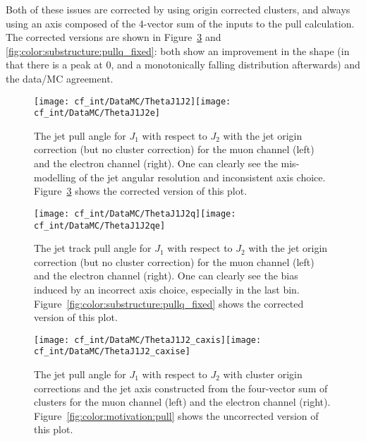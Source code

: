 Both of these issues are corrected by using origin corrected clusters, and always using an axis composed of the 4-vector sum of the inputs to the pull calculation. The corrected versions are shown in Figure~\ref{fig:color:substructure:pull_fixed} and \ref{fig:color:substructure:pullq_fixed}: both show an improvement in the shape (in that there is a peak at 0, and a monotonically falling distribution afterwards) and the data/MC agreement.


\begin{figure}[h!]
\begin{center}
\texttt{[image: cf\_int/DataMC/ThetaJ1J2]}\texttt{[image: cf\_int/DataMC/ThetaJ1J2e]}
 \caption{The jet pull angle for $J_1$ with respect to $J_2$ with the jet origin correction (but no cluster correction) for the muon channel (left) and the electron channel (right). One can clearly see the mis-modelling of the jet angular resolution and inconsistent axis choice. Figure~\ref{fig:color:substructure:pull_fixed} shows the corrected version of this plot.}
 \label{fig:color:substructure:pull}
  \end{center}
\end{figure}

\begin{figure}[h!]
\begin{center}
\texttt{[image: cf\_int/DataMC/ThetaJ1J2q]}\texttt{[image: cf\_int/DataMC/ThetaJ1J2qe]}
 \caption{The jet track pull angle for $J_1$ with respect to $J_2$ with the jet origin correction (but no cluster correction) for the muon channel (left) and the electron channel (right). One can clearly see the bias induced by an incorrect axis choice, especially in the last bin. Figure~\ref{fig:color:substructure:pullq_fixed} shows the corrected version of this plot. }
 \label{fig:color:substructure:pullq}
  \end{center}
\end{figure}

\begin{figure}[h!]
\begin{center}
\texttt{[image: cf\_int/DataMC/ThetaJ1J2\_caxis]}\texttt{[image: cf\_int/DataMC/ThetaJ1J2\_caxise]}
 \caption{The jet pull angle for $J_1$ with respect to $J_2$ with cluster origin corrections and the jet axis constructed from the four-vector sum of clusters for the muon channel (left) and the electron channel (right). Figure~\ref{fig:color:motivation:pull} shows the uncorrected version of this plot. }
 \label{fig:color:substructure:pull_fixed}
  \end{center}
\end{figure}

